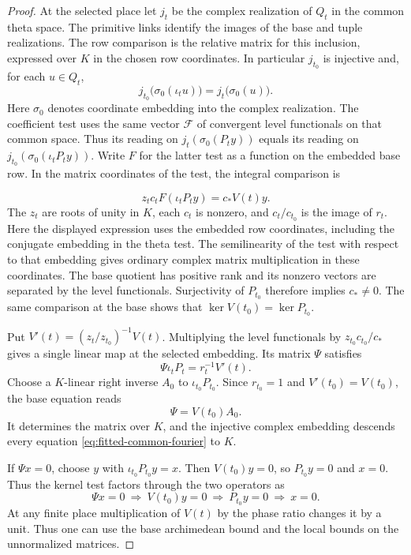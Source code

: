 \begin{proof}
At the selected place let \(j_t\) be the complex realization of
\(Q_t\) in the common theta space. The primitive links identify
the images of the base and tuple realizations. The row comparison
is the relative matrix for this inclusion, expressed over \(K\)
in the chosen row coordinates. In particular \(j_{t_0}\) is
injective and, for each \(u\in Q_t\),
\[
    j_{t_0}\bigl(\sigma_0(\iota_t u)\bigr)
                  =j_t\bigl(\sigma_0(u)\bigr).
\]
Here \(\sigma_0\) denotes coordinate embedding into the complex
realization. The coefficient test uses the same vector \(\mathcal F\)
of convergent level functionals on that common space. Thus its
reading on \(j_t(\sigma_0(P_t y))\) equals its reading on
\(j_{t_0}(\sigma_0(\iota_t P_t y))\). Write \(F\) for the latter
test as a function on the embedded base row. In the matrix
coordinates of the test, the integral comparison is

\[
  z_t c_t F(\iota_t P_t y)=c_* V(t)y.
\]
The \(z_t\) are roots of unity in \(K\), each \(c_t\) is nonzero,
and \(c_t/c_{t_0}\) is the image of \(r_t\).
Here the displayed expression uses the embedded row coordinates,
including the conjugate embedding in the theta test. The
semilinearity of the test with respect to that embedding gives
ordinary complex matrix multiplication in these coordinates.
The base quotient has positive rank and its nonzero vectors are
separated by the level functionals. Surjectivity of \(P_{t_0}\)
therefore implies \(c_*\ne0\). The same comparison at the base
shows that \(\ker V(t_0)=\ker P_{t_0}\).

Put \(V'(t)=(z_t/z_{t_0})^{-1}V(t)\).
Multiplying the level functionals by \(z_{t_0}c_{t_0}/c_*\)
gives a single linear map at the selected embedding. Its
matrix \(\Psi\) satisfies
\begin{equation}\label{eq:fitted-common-fourier}
 \Psi\iota_t P_t=r_t^{-1}V'(t).
\end{equation}
Choose a \(K\)-linear right inverse \(A_0\) to
\(\iota_{t_0}P_{t_0}\). Since \(r_{t_0}=1\) and
\(V'(t_0)=V(t_0)\), the base equation reads
\[
                   \Psi=V(t_0)A_0.
\]
It determines the matrix over \(K\), and the injective complex
embedding descends every equation \eqref{eq:fitted-common-fourier}
to \(K\).

If \(\Psi x=0\), choose \(y\) with
\(\iota_{t_0}P_{t_0}y=x\). Then \(V(t_0)y=0\), so
\(P_{t_0}y=0\) and \(x=0\).
Thus the kernel test factors through the two operators as
\[
  \Psi x=0\ \Longrightarrow\ V(t_0)y=0\ \Longrightarrow\ P_{t_0}y=0\ \Longrightarrow\ x=0 .
\]
 At any finite place multiplication
of \(V(t)\) by the phase ratio changes it by a unit. Thus
one can use the base archimedean bound and the local bounds on
the unnormalized matrices.


\end{proof}
